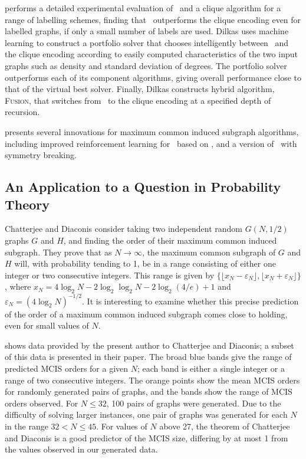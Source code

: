 \citet{dilkas2018} performs a detailed experimental evaluation
of \McSplit\ and a clique algorithm for a range of labelling schemes, finding that \McSplit\
outperforms the clique encoding even for labelled graphs, if only a small number of labels are
used.  Dilkas uses machine learning to construct a portfolio solver that chooses intelligently
between \McSplit\ and the clique encoding according to easily computed characteristics of the
two input graphs such as density and standard deviation of degrees. The portfolio solver
outperforms each of its component algorithms, giving overall performance close to that of the virtual
best solver.  Finally, Dilkas constructs hybrid algorithm, \textsc{Fusion}, that switches
from \McSplit\ to the clique encoding at a specified depth of recursion.

\cite{trummer2021} presents several innovations for maximum common induced subgraph algorithms,
including improved reinforcement learning for \McSplit\ based on
\citet{DBLP:conf/aaai/0001LJ020}, and a version of \McSplit\ with symmetry breaking.

\subsection{An Application to a Question in Probability Theory}

Chatterjee and Diaconis \cite{chatterjee2021isomorphisms} consider taking two
independent random $G(N, 1/2)$ graphs $G$ and $H$, and finding the order of their maximum
common induced subgraph.  They prove that as $N\to\infty$, the maximum common
subgraph of $G$ and $H$ will, with probability tending to 1, be in a range
consisting of either one integer or two consecutive integers.  This range
is given by $\{\lfloor x_N - \varepsilon_N\rfloor, \lfloor x_N + \varepsilon_N\rfloor\}$,
where $x_N = 4 \log_2 N - 2 \log_2\log_2 N - 2 \log_2(4/e) + 1$
and $\varepsilon_N = (4 \log_2 N)^{-1/2}$.  It is interesting to examine whether
this precise prediction of the order of a maximum common induced subgraph
comes close to holding, even for small values of $N$.

shows data provided by the present author to Chatterjee and Diaconis; a subset
of this data is presented in their paper.  The broad blue bands give the
range of predicted MCIS orders for a given $N$; each band is either a single
integer or a range of two consecutive integers.  The orange points show the mean
MCIS orders for randomly generated pairs of graphs, and the bands show the
range of MCIS orders observed.  For $N \leq 32$, 100 pairs of graphs were
generated.  Due to the difficulty of solving larger instances, one pair
of graphs was generated for each $N$ in the range $32 < N \leq 45$.  For values
of $N$ above 27, the theorem of Chatterjee and Diaconis is a good predictor
of the MCIS size, differing by at most 1 from the values observed in our
generated data.

